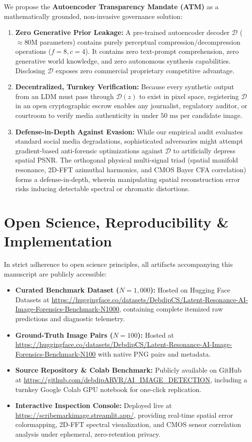 \documentclass{article}
\theoremstyle{definition}
\begin{document}
We propose the \textbf{Autoencoder Transparency Mandate (ATM)} as a mathematically grounded, non-invasive governance solution:
\begin{enumerate}
    \item \textbf{Zero Generative Prior Leakage:} A pre-trained autoencoder decoder $\mathcal{D}$ ($\approx 80\text{M}$ parameters) contains purely perceptual compression/decompression operations ($f=8, c=4$). It contains zero text-prompt comprehension, zero generative world knowledge, and zero autonomous synthesis capabilities. Disclosing $\mathcal{D}$ exposes zero commercial proprietary competitive advantage.
    \item \textbf{Decentralized, Turnkey Verification:} Because every synthetic output from an LDM must pass through $\mathcal{D}(z)$ to exist in pixel space, registering $\mathcal{D}$ in an open cryptographic escrow enables any journalist, regulatory auditor, or courtroom to verify media authenticity in under $50\text{ ms}$ per candidate image.
    \item \textbf{Defense-in-Depth Against Evasion:} While our empirical audit evaluates standard social media degradations, sophisticated adversaries might attempt gradient-based anti-forensic optimizations against $\mathcal{D}$ to artificially depress spatial PSNR. The orthogonal physical multi-signal triad (spatial manifold resonance, 2D-FFT azimuthal harmonics, and CMOS Bayer CFA correlation) forms a defense-in-depth, wherein manipulating spatial reconstruction error risks inducing detectable spectral or chromatic distortions.
\end{enumerate}

\section{Open Science, Reproducibility \& Implementation}
\label{sec:reproducibility}

In strict adherence to open science principles, all artifacts accompanying this manuscript are publicly accessible:
\begin{itemize}
    \item \textbf{Curated Benchmark Dataset ($N=1,000$):} Hosted on Hugging Face Datasets at \url{https://huggingface.co/datasets/DebdipCS/Latent-Resonance-AI-Image-Forensics-Benchmark-N1000}, containing complete itemized raw predictions and diagnostic telemetry.
    \item \textbf{Ground-Truth Image Pairs ($N=100$):} Hosted at \url{https://huggingface.co/datasets/DebdipCS/Latent-Resonance-AI-Image-Forensics-Benchmark-N100} with native PNG pairs and metadata.
    \item \textbf{Source Repository \& Colab Benchmark:} Publicly available on GitHub at \url{https://github.com/debdipARVR/AI_IMAGE_DETECTION}, including a turnkey Google Colab GPU notebook for one-click replication.
    \item \textbf{Interactive Inspection Console:} Deployed live at \url{https://scribemarkimage.streamlit.app/}, providing real-time spatial error colormapping, 2D-FFT spectral visualization, and CMOS sensor correlation analysis under ephemeral, zero-retention privacy.
\end{itemize}
\end{document}
